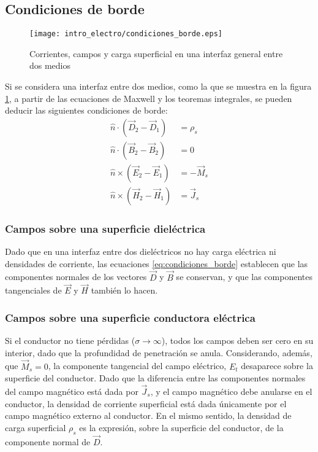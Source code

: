 \subsection{Condiciones de borde}

\begin{figure}[htp]
	\centering
	\texttt{[image: intro\_electro/condiciones\_borde.eps]}
	\caption{Corrientes, campos y carga superficial en una interfaz general entre dos medios \cite{Pozar:MwEngineering}}
	\label{fig:condiciones_borde}
\end{figure}

Si se considera una interfaz entre dos medios, como la que se muestra en la figura \ref{fig:condiciones_borde}, a partir de las ecuaciones de Maxwell y los teoremas integrales, se pueden deducir las siguientes condiciones de borde:
\begin{subequations}
	\label{eq:condiciones_borde}
	\begin{align}
		\hat{n} \cdot (\vec{D}_{2} - \vec{D}_{1}) & = \rho_s \\
		\hat{n} \cdot (\vec{B}_{2} - \vec{B}_{2}) & = 0 \\
		\hat{n} \times (\vec{E}_2 - \vec{E}_1)  & = - \vec{M}_s \\
		\hat{n} \times (\vec{H}_2 - \vec{H}_1) & = \vec{J}_s
	\end{align}
\end{subequations}

\subsubsection{Campos sobre una superficie dieléctrica}
Dado que en una interfaz entre dos dieléctricos no hay carga eléctrica ni densidades de corriente, las ecuaciones \ref{eq:condiciones_borde} establecen que las componentes normales de los vectores $\vec{D}$ y $\vec{B}$ se conservan, y que las componentes tangenciales de $\vec{E}$ y $\vec{H}$ también lo hacen.

\subsubsection{Campos sobre una superficie conductora eléctrica}
Si el conductor no tiene pérdidas ($\sigma \rightarrow \infty$), todos los campos deben ser cero en su interior, dado que la profundidad de penetración se anula. Considerando, además, que $\vec{M}_s = 0$, la componente tangencial del campo eléctrico, $E_t$ desaparece sobre la superficie del conductor. Dado que la diferencia entre las componentes normales del campo magnético está dada por $\vec{J}_s$, y el campo magnético debe anularse en el conductor, la densidad de corriente superficial está dada únicamente por el campo magnético externo al conductor. En el mismo sentido, la densidad de carga superficial $\rho_s$ es la expresión, sobre la superficie del conductor, de la componente normal de $\vec{D}$.

